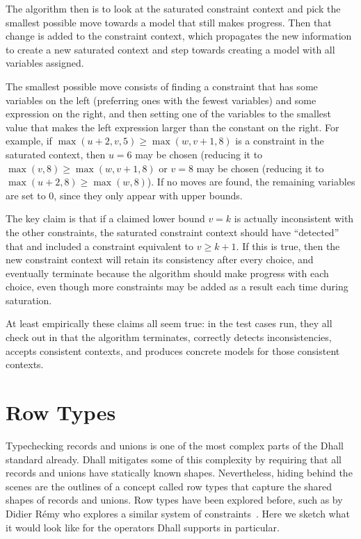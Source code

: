 \documentclass[11pt, twoside, reqno]{book}
\begin{document}
The algorithm then is to look at the saturated constraint context and pick the smallest possible move towards a model that still makes progress.
Then that change is added to the constraint context, which propagates the new information to create a new saturated context and step towards creating a model with all variables assigned.

The smallest possible move consists of finding a constraint that has some variables on the left (preferring ones with the fewest variables) and some expression on the right, and then setting one of the variables to the smallest value that makes the left expression larger than the constant on the right.
For example, if \(\max(u+2, v, 5) \ge \max(w, v+1, 8)\) is a constraint in the saturated context, then \(u = 6\) may be chosen (reducing it to \(\max(v, 8) \ge \max(w, v+1, 8)\) or \(v = 8\) may be chosen (reducing it to \(\max(u+2, 8) \ge \max(w, 8)\)).
If no moves are found, the remaining variables are set to \(0\), since they only appear with upper bounds.

The key claim is that if a claimed lower bound \(v = k\) is actually inconsistent with the other constraints, the saturated constraint context should have “detected” that and included a constraint equivalent to \(v \ge k+1\).
If this is true, then the new constraint context will retain its consistency after every choice, and eventually terminate because the algorithm should make progress with each choice, even though more constraints may be added as a result each time during saturation.

At least empirically these claims all seem true: in the test cases run, they all check out in that the algorithm terminates, correctly detects inconsistencies, accepts consistent contexts, and produces concrete models for those consistent contexts.





\chapter{Row Types}
Typechecking records and unions is one of the most complex parts of the Dhall standard already.
Dhall mitigates some of this complexity by requiring that all records and unions have statically known shapes.
Nevertheless, hiding behind the scenes are the outlines of a concept called row types that capture the shared shapes of records and unions.
Row types have been explored before, such as by Didier R\'{e}my who explores a similar system of constraints~\cite{10.5555/186677.186689}.
Here we sketch what it would look like for the operators Dhall supports in particular.
\end{document}
